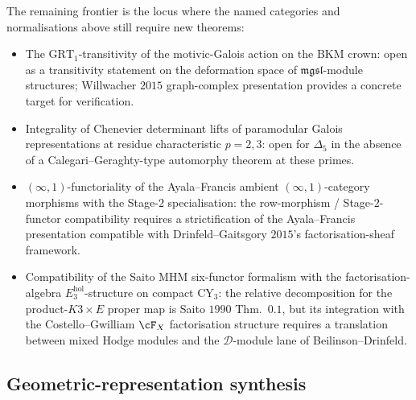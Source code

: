 \begin{theorem}
\label{wn:thm:third-pass-frontier}

The remaining frontier is the locus where the named categories and
normalisations above still require new theorems:
\begin{itemize}
\item The $\mathrm{GRT}_1$-transitivity of the motivic-Galois action
on the BKM crown: open as a transitivity statement on the
deformation space of $\mathfrak{mgsl}$-module structures;
Willwacher $2015$ graph-complex presentation provides a concrete
target for verification.
\item Integrality of Chenevier determinant lifts of paramodular
Galois representations at residue characteristic $p = 2, 3$: open
for $\Delta_5$ in the absence of a Calegari--Geraghty-type
automorphy theorem at these primes.
\item $(\infty, 1)$-functoriality of the Ayala--Francis ambient
$(\infty, 1)$-category morphisms with the Stage-$2$ specialisation:
the row-morphism / Stage-$2$-functor compatibility requires a
strictification of the Ayala--Francis presentation compatible with
Drinfeld--Gaitsgory $2015$'s factorisation-sheaf framework.
\item Compatibility of the Saito $\mathrm{MHM}$ six-functor formalism
with the factorisation-algebra $E_3^{\mathrm{hol}}$-structure on
compact CY$_3$: the relative decomposition for the
product-$K3\times E$ proper map is Saito $1990$ Thm.~$0.1$, but its
integration with the Costello--Gwilliam $\cF_X$ factorisation
structure requires a translation between mixed Hodge modules and
the $\mathcal{D}$-module lane of Beilinson--Drinfeld.
\end{itemize}
\end{theorem}

\subsection{Geometric-representation synthesis}
\label{wn:subsec:third-pass-one-line}

